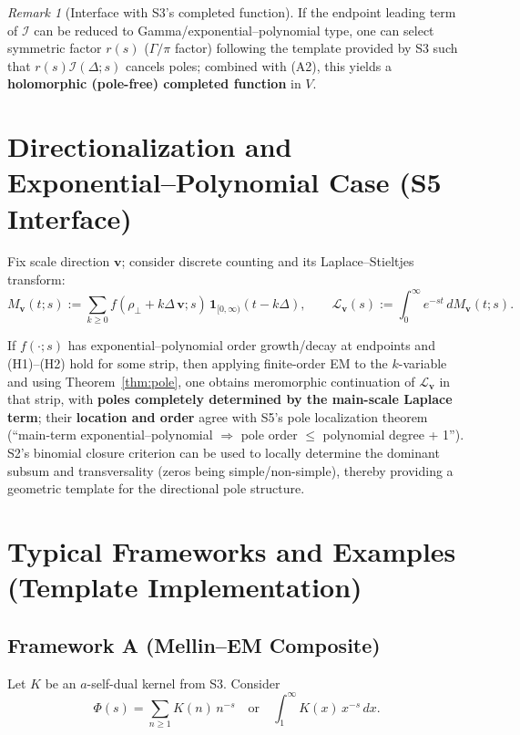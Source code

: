 \documentclass[11pt,a4paper]{article}
\theoremstyle{remark}
\newtheorem{remark}[theorem]{Remark}
\begin{document}
\begin{remark}[Interface with S3's completed function]
If the endpoint leading term of $\mathcal{I}$ can be reduced to Gamma/exponential--polynomial type, one can select symmetric factor $r(s)$ ($\Gamma/\pi$ factor) following the template provided by S3 such that $r(s)\mathcal{I}(\Delta;s)$ cancels poles; combined with (A2), this yields a \textbf{holomorphic (pole-free) completed function} in $V$.
\end{remark}

\section{Directionalization and Exponential--Polynomial Case (S5 Interface)}

Fix scale direction $\mathbf{v}$; consider discrete counting and its Laplace--Stieltjes transform:
\begin{equation}
M_{\mathbf{v}}(t;s):=\sum_{k\ge 0} f(\rho_\perp+k\Delta\,\mathbf{v};s)\,\mathbf{1}_{[0,\infty)}(t-k\Delta),\qquad
\mathcal{L}_{\mathbf{v}}(s):=\int_{0}^{\infty} e^{-st}\,dM_{\mathbf{v}}(t;s).
\end{equation}

If $f(\cdot;s)$ has exponential--polynomial order growth/decay at endpoints and (H1)--(H2) hold for some strip, then applying finite-order EM to the $k$-variable and using Theorem~\ref{thm:pole}, one obtains meromorphic continuation of $\mathcal{L}_{\mathbf{v}}$ in that strip, with \textbf{poles completely determined by the main-scale Laplace term}; their \textbf{location and order} agree with S5's pole localization theorem (``main-term exponential--polynomial $\Rightarrow$ pole order $\le$ polynomial degree + 1''). S2's binomial closure criterion can be used to locally determine the dominant subsum and transversality (zeros being simple/non-simple), thereby providing a geometric template for the directional pole structure.

\section{Typical Frameworks and Examples (Template Implementation)}

\subsection{Framework A (Mellin--EM Composite)}

Let $K$ be an $a$-self-dual kernel from S3. Consider
\begin{equation}
\Phi(s)=\sum_{n\ge1} K(n)\,n^{-s}\quad\text{or}\quad \int_{1}^{\infty} K(x)\,x^{-s}\,dx.
\end{equation}
\end{document}
